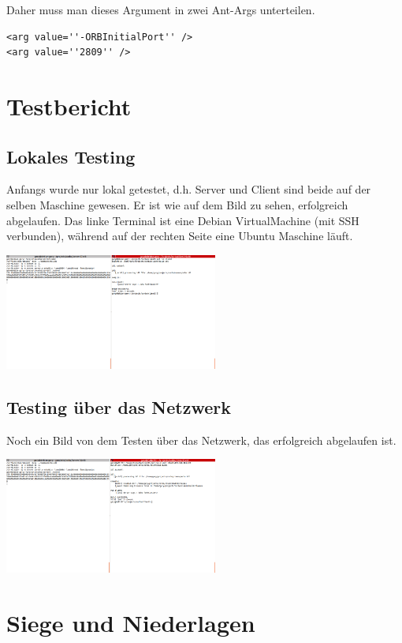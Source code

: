 \documentclass[11pt]{article}
\begin{document}
Daher muss man dieses Argument in zwei Ant-Args unterteilen.
\begin{lstlisting}
<arg value=''-ORBInitialPort'' />
<arg value=''2809'' />
\end{lstlisting}


\section{Testbericht}
\subsection{Lokales Testing}

Anfangs wurde nur lokal getestet, d.h. Server und Client sind beide auf der selben Maschine gewesen. Er ist wie auf dem Bild zu sehen, erfolgreich abgelaufen. Das linke Terminal ist eine Debian VirtualMachine (mit SSH verbunden), während auf der rechten Seite eine Ubuntu Maschine läuft.

\begin{center}
  \includegraphics[width=\textwidth, height=1.5in]{test_local}
\end{center}

\subsection{Testing über das Netzwerk}
Noch ein Bild von dem Testen über das Netzwerk, das erfolgreich abgelaufen ist.

\begin{center}
  \includegraphics[width=\textwidth, height=1.5in]{test_network}
\end{center}

\section{Siege und Niederlagen}
\end{document}
